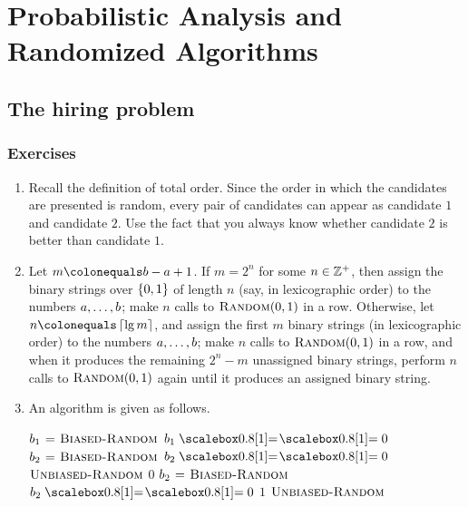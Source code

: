 \setcounter{chapter}{4}
\chapter{Probabilistic Analysis and Randomized Algorithms}
\section{The hiring problem}
\subsection*{Exercises}
\begin{enumerate}[\thesection-1]
%
\item Recall the definition of total order. Since the order in which the candidates are presented is random, every pair of candidates can appear as candidate $1$ and candidate $2$. Use the fact that you always know whether candidate $2$ is better than candidate $1$.
%
\item Let $m \defas b - a + 1$. If $m = 2^n$ for some $n \in {\mathbb{Z}^+}$, then assign the binary strings over $\left\{0, 1\right\}$ of length $n$ (say, in lexicographic order) to the numbers $a, \ldots, b$; make $n$ calls to $\textnormal{\scshape Random}(0, 1)$ in a row. Otherwise, let $n \defas \ceil{\lg m}$, and assign the first $m$ binary strings (in lexicographic order) to the numbers $a, \ldots, b$; make $n$ calls to $\textnormal{\scshape Random}(0, 1)$ in a row, and when it produces the remaining $2^n - m$ unassigned binary strings, perform $n$ calls to $\textnormal{\scshape Random}(0, 1)$ again until it produces an assigned binary string.
%
\item An algorithm is given as follows.
\begin{codebox}
\li $b_1 \mathrel{\hspace{1pt}=\hspace{1pt}} \textnormal{\scshape Biased-Random}$
\li \If $b_1 \isequal 0$
\li \Then
          $b_2 \mathrel{\hspace{1pt}=\hspace{1pt}} \textnormal{\scshape Biased-Random}$
\li       \If $b_2 \isequal 0$
\li       \Then
                \Return $\textnormal{\scshape Unbiased-Random}$
\li       \Else
\li             \Return $0$
\zi             {}
          \End
\li \Else {}
\li       $b_2 \mathrel{\hspace{1pt}=\hspace{1pt}} \textnormal{\scshape Biased-Random}$
\li       \If $b_2 \isequal 0$
\li       \Then
                \Return $1$
\zi             {}
\li       \Else
\li             \Return $\textnormal{\scshape Unbiased-Random}$
          \End
     \End
\end{codebox}
%
\end{enumerate}

